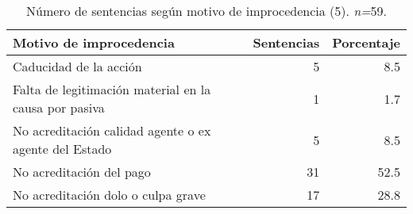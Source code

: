 \begin{table}[!htbp]
\centering
\caption{Número de sentencias según motivo de improcedencia (5). \textit{n=}59.} 
\label{tab:improcedencia}
\begin{tabular}{lrr}
  \hline
Motivo de improcedencia & Sentencias & Porcentaje \\ 
  \hline
Caducidad de la acción &  5 & 8.5 \\ 
  Falta de legitimación material en la causa por pasiva &  1 & 1.7 \\ 
  No acreditación calidad agente o ex agente del Estado &  5 & 8.5 \\ 
  No acreditación del pago & 31 & 52.5 \\ 
  No acreditación dolo o culpa grave & 17 & 28.8 \\ 
   \hline
\end{tabular}
\end{table}
